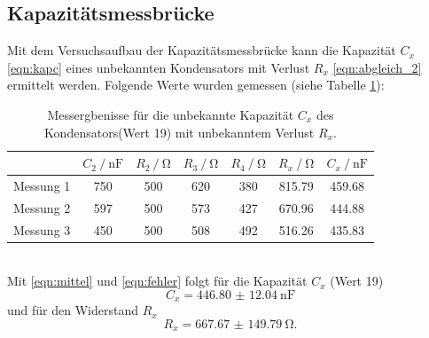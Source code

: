 \subsection{Kapazitätsmessbrücke}
Mit dem Versuchsaufbau der Kapazitätsmessbrücke kann die Kapazität $C_x$ \eqref{eqn:kapc}
eines unbekannten Kondensators mit Verlust $R_x$ \eqref{eqn:abgleich_2} ermittelt werden.
Folgende Werte wurden gemessen (siehe Tabelle \ref{tab:b_19}):
\begin{table}
  \centering
  \begin{tabular}{c|cccccc}
    \toprule
    & {$C_2 \:/\: \si{\nano \farad}$} & {$R_2\:/\: \si{\ohm}$} & {$R_3\:/\: \si{\ohm}$} & {$R_4\:/\: \si{\ohm}$} & {$R_x\:/\: \si{\ohm}$} & {$C_x \:/\: \si{\nano\farad}$} \\
    \midrule
    {Messung 1} & 750 & 500 & 620 & 380 & 815.79 & 459.68\\
    {Messung 2} & 597 & 500 & 573 & 427 & 670.96 & 444.88\\
    {Messung 3} & 450 & 500 & 508 & 492 & 516.26 & 435.83\\
    \bottomrule
  \end{tabular}
  \caption{Messergbenisse für die unbekannte Kapazität $C_x$ des Kondensators(Wert 19) mit unbekanntem Verlust $R_x$.}
  \label{tab:b_19}
\end{table}
\\
Mit \eqref{eqn:mittel} und \eqref{eqn:fehler} folgt für die Kapazität $C_x$ (Wert 19)
\begin{equation*}
 C_x = \SI{446.80(1204)}{\nano \farad}
\end{equation*}
und für den Widerstand $R_x$
\begin{equation*}
  R_x = \SI{667.67(14979)}{\ohm}.
\end{equation*}
